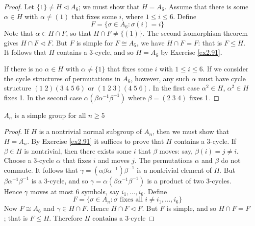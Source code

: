 \documentclass[11pt]{article}
\begin{document}
\begin{proof}
Let \(\{1\}\neq H\triangleleft A_6\); we must show that \(H=A_6\). Assume that there
is some \(\alpha\in H\) with \(\alpha\neq (1)\) that fixes some \(i\), where \(1\le
i\le 6\). Define
\begin{equation*}
F=\{\sigma\in A_6:\sigma(i)=i\}
\end{equation*}
Note that \(\alpha\in H\cap F\), so that \(H\cap F\neq\{(1)\}\). The second
isomorphism theorem gives \(H\cap F\triangleleft F\). But \(F\) is simple for
\(F\cong A_5\), we have \(H\cap F=F\): that is \(F\le H\). It follows that \(H\)
contains a 3-cycle, and so \(H=A_6\) by Exercise \ref{ex2.91}.

If there is no \(\alpha\in H\) with \(\alpha\neq\{1\}\) that fixes some \(i\) with
\(1\le i\le 6\). If we consider the cycle structures of permutations in \(A_6\),
however, any such \(\alpha\) must have cycle structure \((1\;2)(3\;4\;5\;6)\) or
\((1\;2\;3)(4\;5\;6)\). In the first case \(\alpha^2\in H\), \(\alpha^2\in H\)
fixes 1. In the second case \(\alpha(\beta\alpha^{-1}\beta^{-1})\) where
\(\beta=(2\;3\;4)\) fixes 1.
\end{proof}

\begin{theorem}[]
\(A_n\) is a simple group for all \(n\ge 5\)
\end{theorem}

\begin{proof}
If \(H\) is a nontrivial normal subgroup of \(A_n\), then we must show that \(H=A_n\).
By Exercise \ref{ex2.91} it suffices to prove that \(H\) contains a 3-cycle. If
\(\beta\in H\) is nontrivial, then there exists some \(i\) that \(\beta\) moves: say,
\(\beta(i)=j\neq i\). Choose a 3-cycle \(\alpha\) that fixes \(i\) and moves \(j\). The
permutations \(\alpha\) and \(\beta\) do not commute. It follows that
\(\gamma=(\alpha\beta\alpha^{-1})\beta^{-1}\) is a nontrivial element of \(H\). But
\(\beta\alpha^{-1}\beta^{-1}\) is a 3-cycle, and so
\(\gamma=\alpha(\beta\alpha^{-1}\beta^{-1})\) is a product of two 3-cycles. Hence
\(\gamma\) moves at most 6 symbols, say \(i_1,\dots,i_6\). Define
\begin{equation*}
F=\{\sigma\in A_n:\sigma\text{ fixes all }i\neq i_1,\dots,i_6\}
\end{equation*}
Now \(F\cong A_6\) and \(\gamma\in H\cap F\). Hence \(H\cap F\triangleleft F\). But
\(F\) is simple, and so \(H\cap F=F\); that is \(F\le H\). Therefore \(H\) contains a
3-cycle 
\end{proof}
\end{document}
